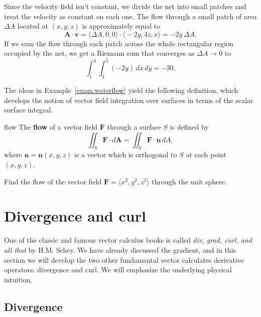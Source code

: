 \documentclass[svgnames]{watsonbook}
\begin{document}
\begin{solution}
  Since the velocity field isn't constant, we divide the net into
  small patches and treat the velocity as constant on each one.  The
  flow through a small patch of area $\Delta A$ located at $(x,y,z)$
  is approximately equal to
  \[
    \mathbf{A} \cdot \mathbf{v} = \big\langle \Delta A, 0, 0 \big\rangle \cdot
    \big\langle -2y, 4z, x \big\rangle = -2y \, \Delta A. 
  \]
  If we sum the flow through each patch across the whole rectangular
  region occupied by the net, we get a Riemann sum that converges as
  $\Delta A \to 0$ to
  \[
    \int_1^4 \int_3^5 (-2y) \, dx \, dy = \boxed{-30}. 
  \]
\end{solution}

The ideas in Example~\ref{exam:waterflow} yield the following
definition, which develops the notion of vector field integration over
surfaces in terms of the scalar surface integral. 

\begin{defn}{}{flow}
  The \textbf{flow} of a vector field $\mathbf{F}$ through a surface
  $S$ is defined by
  \[
    \iint_S \mathbf{F} \cdot d\mathbf{A} =  \iint_S \mathbf{F} \cdot \mathbf{n}
    \, dA, 
  \]
  where $\mathbf{n}=\mathbf{n}(x,y,z)$ is a vector which is
  orthogonal to $S$ at each point $(x,y,z)$. 
\end{defn}

\begin{exercise}{}{}
  Find the flow of the vector field $\mathbf{F} = \langle x^2, y^2, z^2 \rangle$
  through the unit sphere. 
\end{exercise}

\section{Divergence and curl} \label{sec:divcurl} 

One of the classic and famous vector calculus books is called \textit{div,
  grad, curl, and all that} by H.M. Schey. We have already discussed the gradient,
and in this section we will develop the two other fundamental vector
calculates derivative operators: divergence and curl. We will
emphasize the underlying physical intuition. 

\subsection{Divergence}

\end{document}
